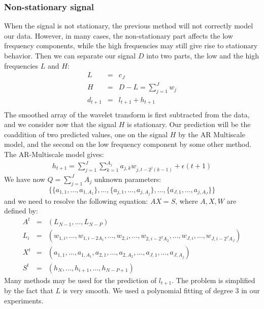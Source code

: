 \subsubsection{Non-stationary signal}
When the signal is not stationary, the previous method will not
correctly model our data. However, in many cases, the 
non-stationary part affects the low frequency components, while
the high frequencies may still give rise to stationary behavior.
Then we can separate our signal $D$ into two parts,   
the low and the high frequencies $L$ and $H$:
\begin{eqnarray*}
L & = & c_J \\
H & = & D - L = \sum_{j=1}^J w_j \\
d_{t+1} & = & l_{t+1} + h_{t+1} \\
\end{eqnarray*}
The smoothed array of the wavelet transform is first subtracted from
the data, and we consider now that the signal $H$ is stationary.
Our prediction will be the coaddition of two predicted values,
one on the signal $H$ by the AR Multiscale model, and the second on
the low frequency component by some other method.
The AR-Multiscale model gives:
\begin{eqnarray}
h_{t+1} = 
\sum_{j=1}^J \sum_{k=1}^{A_j} a_{j,k} w_{j,t-2^{j}(k-1)} +  \epsilon(t+1)
\end{eqnarray}
We have now $Q = \sum_{j=1}^{J} A_{j}$ unknown parameters: 
$$\{\{a_{1,1},...,a_{1,A_1}\},..., 
\{a_{j,1},...,a_{j,A_j}\},..., 
\{a_{J,1},...,a_{j,A_J}\} \}$$ and
we need to resolve the following equation: $A X = S$,
where $A,X,W$ are defined by:
\begin{eqnarray*}
A^t & = & (L_{N-1}, \dots, L_{N-P}) \\
L_i & = & (w_{1,i}, \dots, w_{1,i-2 A_1}, \dots, w_{2,i}, \dots, w_{2,i-2^2 A_2},
\dots, w_{J,i}, \dots, w_{J,i-2^J A_J}) \\ 
X^t & = & (a_{1,1},\dots, a_{1,A_1},a_{2,1}, \dots,a_{2,A_2},
 \dots, a_{J,1}, \dots, a_{J,A_j})  \\
S^t & = & (h_N, \dots, h_{i+1},  \dots, h_{N-P+1})  
\end{eqnarray*}
Many methods may be used for the prediction of $l_{t+1}$. The problem
is simplified by the fact that $L$ is very smooth. We used a polynomial
fitting of degree 3 in our experiments.

